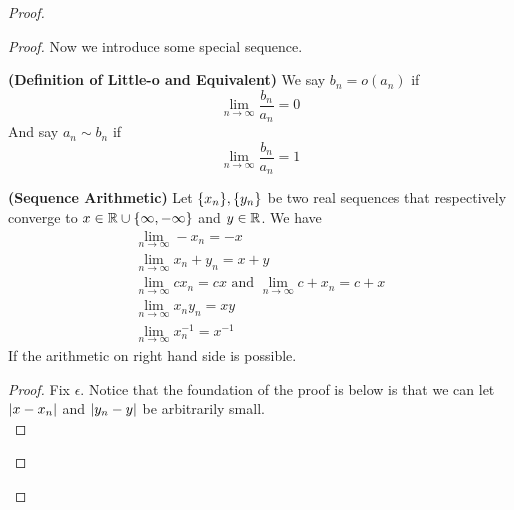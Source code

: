 \documentclass{report}
\begin{document}
\begin{proof}
\begin{proof}
{\begin{minipage}{39em}
Now we introduce some special sequence. 
\end{minipage}}
\begin{definition}
\label{4.1.5}
\textbf{(Definition of Little-o and Equivalent)} We say $b_n=o(a_n)$ if
\begin{equation}
\lim_{n\to\infty}\frac{b_n}{a_n}=0
\end{equation}
And say $a_n\sim b_n$ if
\begin{equation}
\lim_{n\to\infty} \frac{b_n}{a_n}=1
\end{equation}
\end{definition}
\begin{theorem}
\label{4.1.6}
\textbf{(Sequence Arithmetic)} Let $\{ x_n \},\{ y_n \}$ be two real sequences that respectively converge to $x\in\mathbb{R}\cup \{ \infty,-\infty \}$ and  $y\in\mathbb{R}$. We have
\begin{gather}
\lim_{n\to\infty} -x_n=-x\\
\lim_{n\to\infty} x_n+y_n= x+y\\
\lim_{n\to\infty} cx_n=cx\text{ and }\lim_{n\to\infty}c+x_n=c+x\\
\lim_{n\to\infty} x_ny_n=xy\\
\lim_{n\to\infty} x_n^{-1}=x^{-1}
\end{gather}
If the arithmetic on right hand side is possible. 
\end{theorem}
\begin{proof}
Fix $\epsilon $. Notice that the foundation of the proof is below is that we can let $|x-x_n|$ and $|y_n-y|$ be arbitrarily small.\\


\end{proof}
\end{proof}
\end{proof}
\end{document}
